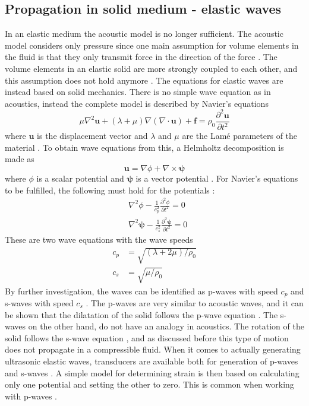 \documentclass[10pt,a4paper]{eitExjobb}
\begin{document}
	\subsection{Propagation in solid medium - elastic waves}
	In an elastic medium the acoustic model is no longer sufficient. The acoustic model considers only pressure since one main assumption for volume elements in the fluid is that they only transmit force in the direction of the force \cite{Kaufman2000}. The volume elements in an elastic solid are more strongly coupled to each other, and this assumption does not hold anymore \cite{Kaufman2005}. The equations for elastic waves are instead based on solid mechanics. There is no simple wave equation as in acoustics, instead the complete model is described by Navier's equations
	\begin{equation*}
	\mu \nabla^2 \bm{u} + (\lambda+\mu) \nabla (\nabla \cdot \bm{u}) + \bm{f} = \rho_0 \frac{\partial^2 \bm{u}}{\partial t^2}
	\end{equation*}
	where $\bm{u}$ is the displacement vector and $\lambda$ and $\mu$ are the Lamé parameters of the material \cite{Schmerr2016}. To obtain wave equations from this, a Helmholtz decomposition is made as
	\begin{equation*}
	\bm{u} = \nabla \phi + \nabla \times \bm{\psi}
	\end{equation*}
	where $\phi$ is a scalar potential and $\bm{\psi}$ is a vector potential \cite{Schmerr2016}. For Navier's equations to be fulfilled, the following must hold for the potentials \cite{Schmerr2016}:
	\begin{align*}
	&\nabla^2 \phi - \frac{1}{c_p^2} \frac{\partial^2 \phi}{\partial t^2} = 0 \\
	&\nabla^2 \bm{\psi} - \frac{1}{c_s^2} \frac{\partial^2 \bm{\psi}}{\partial t^2} = 0
	\end{align*}
	These are two wave equations with the wave speeds \cite{Schmerr2016}
	\begin{align*}
	c_p &= \sqrt{(\lambda + 2\mu)/\rho_0} \\
	c_s &= \sqrt{\mu/\rho_0}
	\end{align*}
	By further investigation, the waves can be identified as p-waves with speed $c_p$ and s-waves with speed $c_s$ \cite{Schmerr2016}. The p-waves are very similar to acoustic waves, and it can be shown that the dilatation of the solid follows the p-wave equation \cite{Schmerr2016}. The s-waves on the other hand, do not have an analogy in acoustics. The rotation of the solid follows the s-wave equation \cite{Schmerr2016}, and as discussed before this type of motion does not propagate in a compressible fluid. When it comes to actually generating ultrasonic elastic waves, transducers are available both for generation of p-waves and s-waves \cite{Schmerr2016}. A simple model for determining strain is then based on calculating only one potential and setting the other to zero. This is common when working with p-waves \cite{Kaufman2000}.
	
\end{document}
